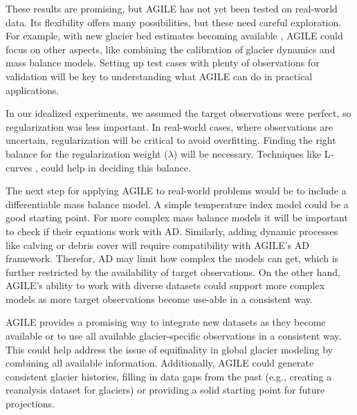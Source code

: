 \documentclass[journal abbreviation, manuscript]{copernicus}
\begin{document}
These results are promising, but AGILE has not yet been tested on real-world data. Its flexibility offers many possibilities, but these need careful exploration. For example, with new glacier bed estimates becoming available \citep[e.g.,][]{Cook2023, vanPelt2025}, AGILE could focus on other aspects, like combining the calibration of glacier dynamics and mass balance models. Setting up test cases with plenty of observations for validation will be key to understanding what AGILE can do in practical applications.

In our idealized experiments, we assumed the target observations were perfect, so regularization was less important. In real-world cases, where observations are uncertain, regularization will be critical to avoid overfitting. Finding the right balance for the regularization weight ($\lambda$) will be necessary. Techniques like L-curves \citep[see, e.g.,][]{Hansen1992, GilletChaulet2012, Recinos2023, Wolovick2023}, could help in deciding this balance.

The next step for applying AGILE to real-world problems would be to include a differentiable mass balance model. A simple temperature index model \citep[e.g.,][]{Marzeion2012} could be a good starting point. For more complex mass balance models \citep[e.g. PyGEM][]{Rounce2020} it will be important to check if their equations work with AD. Similarly, adding dynamic processes like calving or debris cover will require compatibility with AGILE’s AD framework. Therefor, AD may limit how complex the models can get, which is further restricted by the availability of target observations. On the other hand, AGILE’s ability to work with diverse datasets could support more complex models as more target observations become use-able in a consistent way.

AGILE provides a promising way to integrate new datasets as they become available or to use all available glacier-specific observations in a consistent way. This could help address the issue of equifinality in global glacier modeling \citep[e.g.][]{Rounce2020} by combining all available information. Additionally, AGILE could generate consistent glacier histories, filling in data gaps from the past (e.g., creating a reanalysis dataset for glaciers) or providing a solid starting point for future projections.

\end{document}
